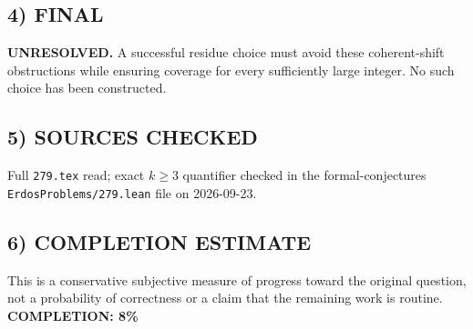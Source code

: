 \subsection{4) FINAL}
\textbf{UNRESOLVED.}
A successful residue choice must avoid these coherent-shift obstructions while ensuring coverage for every sufficiently large integer. No such choice has been constructed.
\subsection{5) SOURCES CHECKED}
Full \texttt{279.tex} read; exact $k\ge3$ quantifier checked in the formal-conjectures \texttt{ErdosProblems/279.lean} file on 2026-09-23.
\subsection{6) COMPLETION ESTIMATE}
This is a conservative subjective measure of progress toward the original question, not a probability of correctness or a claim that the remaining work is routine.
\textbf{COMPLETION: 8\%}
